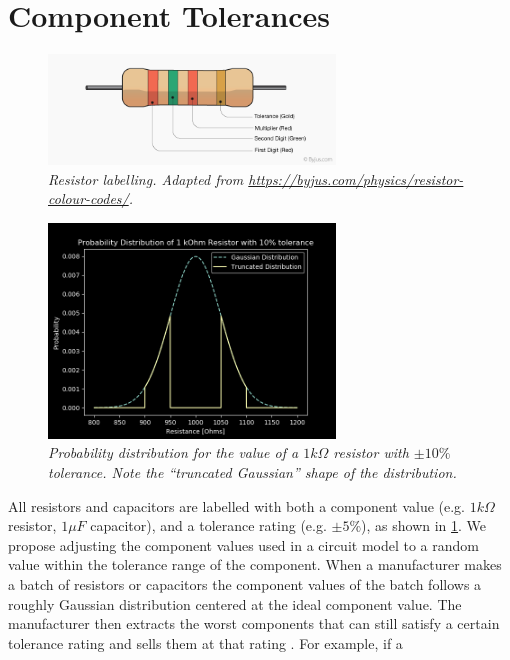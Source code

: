 \documentclass[twoside,a4paper]{article}
\begin{document}
\section{Component Tolerances} \label{sec:tol}
%
\begin{figure}[h]
    \center
    \includegraphics[width=3in]{../CMTolerance/Pics/resistor.png}
    \caption{\label{ResistorLabel}{\it Resistor labelling. Adapted
            from \url{https://byjus.com/physics/resistor-colour-codes/}.}}
\end{figure}
%
\begin{figure}[h]
    \center
    \includegraphics[width=3in]{../CMTolerance/Pics/tgauss_pdf_better.png}
    \caption{\label{trunc_guass}{\it Probability distribution for the
            value of a $1 k\Omega$ resistor with $\pm 10\%$ tolerance.
            Note the ``truncated Gaussian'' shape of the distribution.}}
\end{figure}
%
All resistors and capacitors are labelled with both a
component value (e.g. $1 k\Omega$ resistor, $1 \mu F$
capacitor), and a tolerance rating (e.g. $\pm 5\%$), as
shown in \cref{ResistorLabel}. We propose adjusting the
component values used in a circuit model to a random
value within the tolerance range of the component.
\newline\newline
When a manufacturer makes a batch of resistors or capacitors
the component values of the batch follows a roughly Gaussian
distribution centered at the ideal component value. The manufacturer
then extracts the worst components that can still satisfy a certain
tolerance rating and sells them at that rating \cite{tolerance}.
For example, if a
\end{document}
